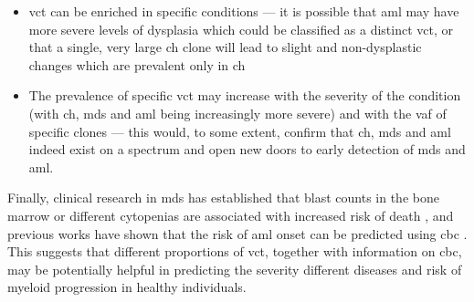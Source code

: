 \begin{itemize}
    \item \Ac{vct} can be enriched in specific conditions --- it is possible that \ac{aml} may have more severe levels of dysplasia which could be classified as a distinct \ac{vct}, or that a single, very large \ac{ch} clone will lead to slight and non-dysplastic changes which are prevalent only in \ac{ch}
    \item The prevalence of specific \ac{vct} may increase with the severity of the condition (with \ac{ch}, \ac{mds} and \ac{aml} being increasingly more severe) and with the \ac{vaf} of specific clones --- this would, to some extent, confirm that \ac{ch}, \ac{mds} and \ac{aml} indeed exist on a spectrum and open new doors to early detection of \ac{mds} and \ac{aml}.
\end{itemize}

Finally, clinical research in \ac{mds} has established that blast counts in the bone marrow or different cytopenias are associated with increased risk of death \cite{Malcovati2020-no,Greenberg2012-en}, and previous works have shown that the risk of \ac{aml} onset can be predicted using \ac{cbc} \cite{Abelson2018-wh}. This suggests that different proportions of \ac{vct}, together with information on \ac{cbc}, may be potentially helpful in predicting the severity different diseases and risk of myeloid progression in healthy individuals.